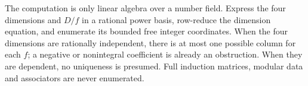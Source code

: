The computation is only linear algebra over a number field. Express the
four dimensions and $D/f$ in a rational power basis, row-reduce the dimension
equation, and enumerate its bounded free integer coordinates. When the
four dimensions are rationally independent, there is at most one possible
column for each $f$; a negative or nonintegral coefficient is already an
obstruction. When they are dependent, no uniqueness is presumed. Full
induction matrices, modular data and associators are never enumerated.


